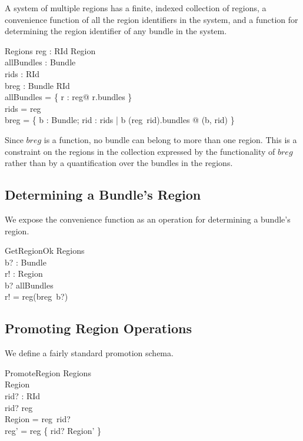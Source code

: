 \documentclass[a4paper,9pt]{article}
\begin{document}
A system of multiple regions has a finite, indexed collection of regions, a convenience function of all the
region identifiers in the system, and a function for
determining the region identifier of any bundle in the system.
\begin{schema}{Regions}
  reg : RId \ffun Region \\
  allBundles : \power Bundle \\
  rids : \power RId \\
  breg : Bundle \pfun RId \\
\where
 allBundles = \bigcup \{ r : \ran reg@ r.bundles \} \\
 rids = \dom reg \\
 breg = \{ b : Bundle; rid : rids | b \in (reg~rid).bundles @ (b, rid) \} \\
\end{schema}
Since $breg$ is a function, no bundle can belong to more than one region.
This is a constraint on the regions in the collection expressed by the functionality of $breg$
rather than by a quantification over the bundles in the regions.

\subsection{Determining a Bundle's Region}

We expose the convenience function as an operation for determining a bundle's region.
\begin{schema}{GetRegionOk}
  \Xi Regions \\
  b? : Bundle \\
  r! : Region \\
\where
  b? \in allBundles \\
  r! = reg(breg~b?) \\
\end{schema}

\subsection{Promoting Region Operations}

We define a fairly standard promotion schema.
\begin{schema}{PromoteRegion}
  \Delta Regions \\
  \Delta Region \\
  rid? : RId \\
\where
  rid? \in \dom reg \\
  \theta Region = reg~rid? \\
  reg' = reg \oplus \{ rid? \mapsto \theta Region' \} \\
\end{schema}
\end{document}
